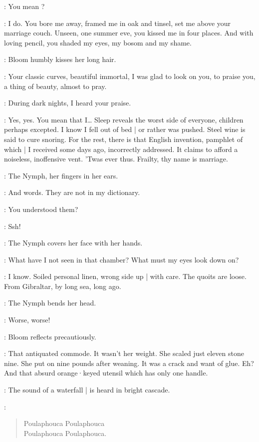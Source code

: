 \Bloom:
You mean ?

\Nymph:
I do.
You bore me away,
framed me in oak and tinsel,
set me above your marriage couch.
Unseen,
one summer eve,
you kissed me in four places.
And with loving pencil,
you shaded my eyes,
my bosom and my shame.

:
Bloom humbly kisses her long hair.

\Bloom:
Your classic curves,
beautiful immortal,
I was glad to look on you,
to praise you,
a thing of beauty,
almost to pray.

\Nymph:
During dark nights,
I heard your praise.%

\Bloom:
Yes,
yes.
You mean that I…
Sleep reveals the worst side of everyone,
children perhaps excepted.
I know I fell out of bed |
or rather was pushed.
Steel wine is said to cure snoring.
For the rest,
there is that English invention,
pamphlet of which |
I received some days ago,
incorrectly addressed.
It claims to afford a noiseless,
inoffensive vent.
'Twas ever thus.
Frailty,
thy name is marriage.

:
The Nymph,
her fingers in her ears.

\Nymph:
And words.
They are not in my dictionary.

\Bloom:
You understood them?

\Yews[3b]:
Ssh!

:
The Nymph covers her face with her hands.

\Nymph:
What have I not seen in that chamber?
What must my eyes look down on?

\Bloom:
I know.
Soiled personal linen,
wrong side up |
with care.
The quoits are loose.
From Gibraltar,
by long sea,
long ago.

:
The Nymph bends her head.

\Nymph:
Worse,
worse!

:
Bloom reflects precautiously.

\Bloom:
That antiquated commode.
It wasn't her weight.
She scaled just eleven stone nine.
She put on nine pounds after weaning.
It was a crack and want of glue.
Eh?
And that absurd orange·keyed utensil which has only one handle.

:
The sound of a waterfall |
is heard in bright cascade.

\Waterfall:
\begin{verse}
    Poulaphouca Poulaphouca\\
%
    Poulaphouca Poulaphouca.
\end{verse}

